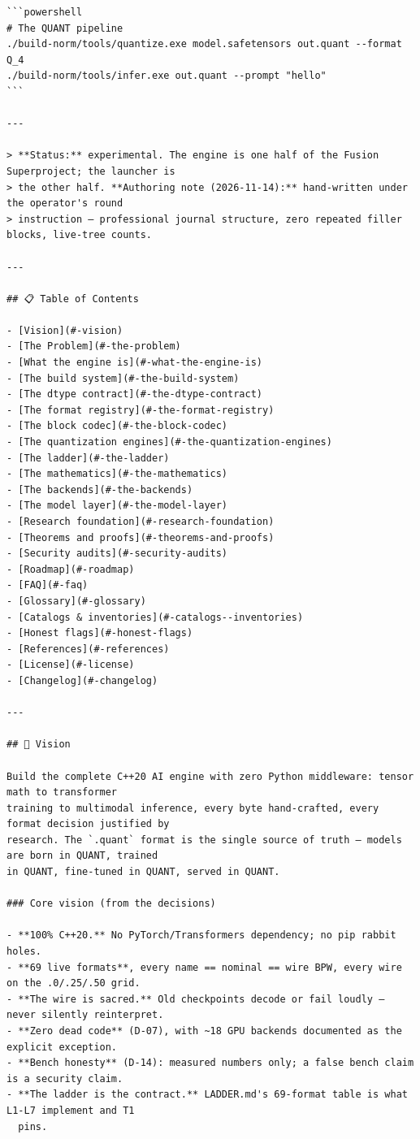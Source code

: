 \begin{Verbatim}[breaklines,breakanywhere,fontsize=\footnotesize]
```powershell
# The QUANT pipeline
./build-norm/tools/quantize.exe model.safetensors out.quant --format Q_4
./build-norm/tools/infer.exe out.quant --prompt "hello"
```

---

> **Status:** experimental. The engine is one half of the Fusion Superproject; the launcher is
> the other half. **Authoring note (2026-11-14):** hand-written under the operator's round
> instruction — professional journal structure, zero repeated filler blocks, live-tree counts.

---

## 📋 Table of Contents

- [Vision](#-vision)
- [The Problem](#-the-problem)
- [What the engine is](#-what-the-engine-is)
- [The build system](#-the-build-system)
- [The dtype contract](#-the-dtype-contract)
- [The format registry](#-the-format-registry)
- [The block codec](#-the-block-codec)
- [The quantization engines](#-the-quantization-engines)
- [The ladder](#-the-ladder)
- [The mathematics](#-the-mathematics)
- [The backends](#-the-backends)
- [The model layer](#-the-model-layer)
- [Research foundation](#-research-foundation)
- [Theorems and proofs](#-theorems-and-proofs)
- [Security audits](#-security-audits)
- [Roadmap](#-roadmap)
- [FAQ](#-faq)
- [Glossary](#-glossary)
- [Catalogs & inventories](#-catalogs--inventories)
- [Honest flags](#-honest-flags)
- [References](#-references)
- [License](#-license)
- [Changelog](#-changelog)

---

## 🎯 Vision

Build the complete C++20 AI engine with zero Python middleware: tensor math to transformer
training to multimodal inference, every byte hand-crafted, every format decision justified by
research. The `.quant` format is the single source of truth — models are born in QUANT, trained
in QUANT, fine-tuned in QUANT, served in QUANT.

### Core vision (from the decisions)

- **100% C++20.** No PyTorch/Transformers dependency; no pip rabbit holes.
- **69 live formats**, every name == nominal == wire BPW, every wire on the .0/.25/.50 grid.
- **The wire is sacred.** Old checkpoints decode or fail loudly — never silently reinterpret.
- **Zero dead code** (D-07), with ~18 GPU backends documented as the explicit exception.
- **Bench honesty** (D-14): measured numbers only; a false bench claim is a security claim.
- **The ladder is the contract.** LADDER.md's 69-format table is what L1-L7 implement and T1
  pins.


\end{Verbatim}
